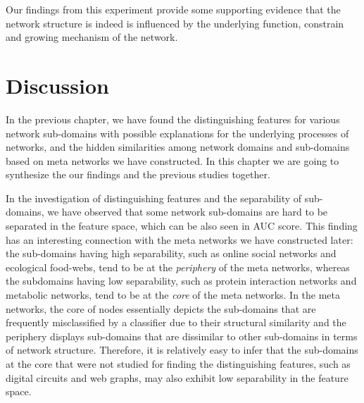 \documentclass{article}
\begin{document}
Our findings from this experiment provide some supporting evidence that the network structure is indeed is influenced by the underlying function, constrain and growing mechanism of the network. 


\newpage
\section{Discussion}
In the previous chapter, we have found the distinguishing features for various network sub-domains with possible explanations for the underlying processes of networks, and the hidden similarities among network domains and sub-domains based on meta networks we have constructed. In this chapter we are going to synthesize the our findings and the previous studies together.

In the investigation of distinguishing features and the separability of sub-domains, we have observed that some network sub-domains are hard to be separated in the feature space, which can be also seen in AUC score. This finding has an interesting connection with the meta networks we have constructed later: the sub-domains having high separability, such as online social networks and ecological food-webs, tend to be at the \textit{periphery} of the meta networks, whereas the subdomains having low separability, such as protein interaction networks and metabolic networks, tend to be at the \textit{core} of the meta networks. In the meta networks, the core of nodes essentially depicts the sub-domains that are frequently misclassified by a classifier due to their structural similarity and the periphery displays sub-domains that are dissimilar to other sub-domains in terms of network structure. Therefore, it is relatively easy to infer that the sub-domains at the core that were not studied for finding the distinguishing features, such as digital circuits and web graphs, may also exhibit low separability in the feature space. 
\end{document}
